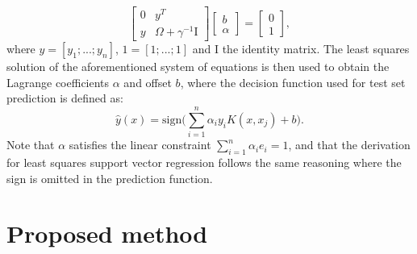 \documentclass[preprint,12pt]{elsarticle}
\begin{document}
	\begin{equation}
	\begin{bmatrix}
	0 & y^T \\
	y & \Omega + \gamma^{-1} \mathrm{I}
	\end{bmatrix}	
	\begin{bmatrix}
	b \\
	\alpha
	\end{bmatrix}
	=
	\begin{bmatrix}
	0 \\
	1
	\end{bmatrix},
	\end{equation}
	where $y  = [y_1;...;y_n]$, $1 = [1;...;1]$ and $\mathrm{I}$ the identity matrix.
	The least squares solution of the aforementioned system of equations is then used to  obtain the Lagrange coefficients $\alpha$ and offset $b$, where the decision function used for test set prediction is defined as:
	\begin{equation}
	\hat{y}(x) = \mathrm{sign}\Big(\sum_{i=1}^{n} \alpha_i y_i K(x, x_j) + b\Big).
	\label{eq:classification}
	\end{equation}
Note that $\alpha$ satisfies the linear constraint $\sum_{i=1}^{n} \alpha_i  e_i = 1$, and that the derivation for least squares support vector regression follows the same reasoning where the sign is omitted in the prediction function. %
	
	
	\section{Proposed method}
	\label{sec:proposed}
	
	
\end{document}
